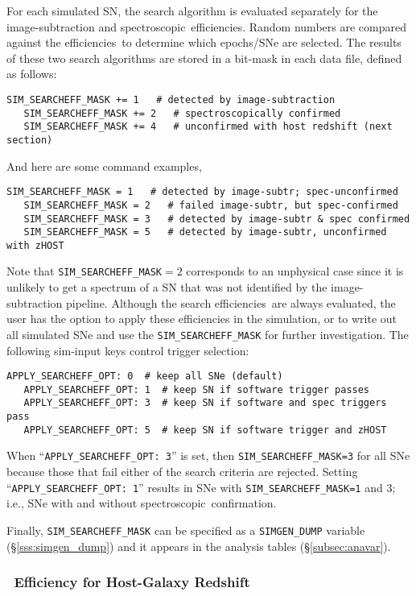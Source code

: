 \documentclass[12pt]{article}
\newcommand{\effs}{efficiencies}
\newcommand{\spec}{spectroscopic}
\begin{document}
{\bigskip
For each simulated SN, the search algorithm
is evaluated separately for the image-subtraction
and \spec\ \effs. Random numbers are compared against
the \effs\ to determine which epochs/SNe are selected.
The results of these two search algorithms are stored
in a bit-mask in each data file, defined as follows:

%
\begin{Verbatim}[frame=single]
   SIM_SEARCHEFF_MASK += 1   # detected by image-subtraction
   SIM_SEARCHEFF_MASK += 2   # spectroscopically confirmed
   SIM_SEARCHEFF_MASK += 4   # unconfirmed with host redshift (next section)
\end{Verbatim}
%
And here are some command examples,
%
\begin{Verbatim}[frame=single]
   SIM_SEARCHEFF_MASK = 1   # detected by image-subtr; spec-unconfirmed
   SIM_SEARCHEFF_MASK = 2   # failed image-subtr, but spec-confirmed
   SIM_SEARCHEFF_MASK = 3   # detected by image-subtr & spec confirmed
   SIM_SEARCHEFF_MASK = 5   # detected by image-subtr, unconfirmed with zHOST
\end{Verbatim}
%
Note that {\tt SIM\_SEARCHEFF\_MASK}$ = 2$ corresponds
to an unphysical case since it is unlikely to get a spectrum
of a SN that was not identified by the image-subtraction pipeline.
Although the search \effs\ are always evaluated, the user has
the option to apply these efficiencies in the simulation,
or to write out all simulated SNe and use the 
{\tt SIM\_SEARCHEFF\_MASK} for further investigation.
The following sim-input keys control trigger selection:
%
\begin{Verbatim}[frame=single]
   APPLY_SEARCHEFF_OPT: 0  # keep all SNe (default)
   APPLY_SEARCHEFF_OPT: 1  # keep SN if software trigger passes
   APPLY_SEARCHEFF_OPT: 3  # keep SN if software and spec triggers pass
   APPLY_SEARCHEFF_OPT: 5  # keep SN if software trigger and zHOST
\end{Verbatim}
%
When ``{\tt APPLY\_SEARCHEFF\_OPT: 3}'' is set,
then {\tt SIM\_SEARCHEFF\_MASK=3} for all SNe
because those that fail either of the search 
criteria are rejected. 
Setting  ``{\tt APPLY\_SEARCHEFF\_OPT: 1}'' results
in SNe with {\tt SIM\_SEARCHEFF\_MASK=1} and 3;
i.e., SNe with and without \spec\ confirmation.


Finally, {\tt SIM\_SEARCHEFF\_MASK} can be specified 
as a {\tt SIMGEN\_DUMP} variable (\S\ref{sss:simgen_dump}) 
and it appears in the analysis tables (\S\ref{subsec:anavar}).

\clearpage
\subsubsection{\Nospec\ Efficiency for Host-Galaxy Redshift }
\label{sss:eff_zHOST}

}
\end{document}
